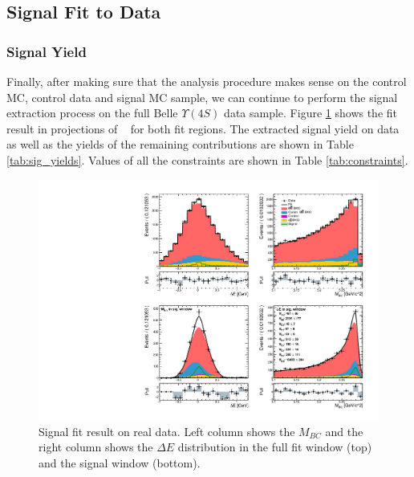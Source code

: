 \subsection{Signal Fit to Data}\label{sec:final-results-from-data}

\subsubsection{Signal Yield}

Finally, after making sure that the analysis procedure makes sense on the control MC, control data and signal MC sample, we can continue to perform the signal extraction process on the full Belle $\Upsilon(4S)$ data sample. Figure \ref{fig:sig_fit_data} shows the fit result in projections of \vars~ for both fit regions. The extracted signal yield on data as well as the yields of the remaining contributions are shown in Table \ref{tab:sig_yields}. Values of all the constraints are shown in Table \ref{tab:constraints}. 

\begin{figure}[H]
	\centering
	\captionsetup{width=0.8\linewidth}
	\includegraphics[width=\linewidth]{fig/sig_fit_data}
	\caption{Signal fit result on real data. Left column shows the $M_{BC}$ and the right column shows the $\Delta E$ distribution in the full fit window (top) and the signal window (bottom).}
	\label{fig:sig_fit_data}
\end{figure} 

